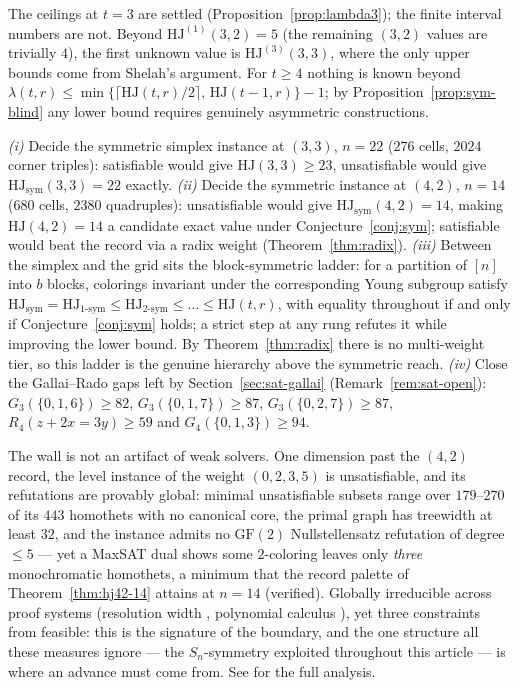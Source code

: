 \documentclass[12pt]{article}
\newcommand{\HJ}{\mathrm{HJ}}
\begin{document}
\begin{question}\label{q:interval}
The ceilings at $t=3$ are settled (Proposition~\ref{prop:lambda3}); the
finite interval numbers are not. Beyond $\HJ^{(1)}(3,2)=5$ (the
remaining $(3,2)$ values are trivially $4$), the first unknown value is
$\HJ^{(3)}(3,3)$, where the only upper bounds come from Shelah's
argument. For $t\ge 4$ nothing is known beyond
$\lambda(t,r)\le\min\{\lceil\HJ(t,r)/2\rceil,\,\HJ(t-1,r)\}-1$; by
Proposition~\ref{prop:sym-blind} any lower bound requires genuinely
asymmetric constructions.
\end{question}

\begin{question}[Frontiers]\label{q:frontiers}
\emph{(i)} Decide the symmetric simplex instance at $(3,3)$, $n=22$
($276$ cells, $2024$ corner triples): satisfiable would give
$\HJ(3,3)\ge 23$, unsatisfiable would give
$\HJ_{\mathrm{sym}}(3,3)=22$ exactly.
\emph{(ii)} Decide the symmetric instance at $(4,2)$, $n=14$ ($680$
cells, $2380$ quadruples): unsatisfiable would give
$\HJ_{\mathrm{sym}}(4,2)=14$, making $\HJ(4,2)=14$ a candidate exact
value under Conjecture~\ref{conj:sym}; satisfiable would beat the
record via a radix weight (Theorem~\ref{thm:radix}).
\emph{(iii)} Between the simplex and the grid sits the block-symmetric
ladder: for a partition of $[n]$ into $b$ blocks, colorings invariant
under the corresponding Young subgroup satisfy
$\HJ_{\mathrm{sym}}=\HJ_{1\text{-}\mathrm{sym}}
\le\HJ_{2\text{-}\mathrm{sym}}\le\dots\le\HJ(t,r)$, with equality
throughout if and only if Conjecture~\ref{conj:sym} holds; a strict
step at any rung refutes it while improving the lower bound. By
Theorem~\ref{thm:radix} there is no multi-weight tier, so this ladder
is the genuine hierarchy above the symmetric reach.
\emph{(iv)} Close the Gallai--Rado gaps left by
Section~\ref{sec:sat-gallai} (Remark~\ref{rem:sat-open}):
$G_{3}(\{0,1,6\})\ge 82$, $G_{3}(\{0,1,7\})\ge 87$,
$G_{3}(\{0,2,7\})\ge 87$, $R_{4}(z+2x=3y)\ge 59$ and
$G_{4}(\{0,1,3\})\ge 94$.
\end{question}

\begin{remark}\label{rem:hardness}
The wall is not an artifact of weak solvers. One dimension past the
$(4,2)$ record, the level instance of the weight $(0,2,3,5)$ is
unsatisfiable, and its refutations are provably global: minimal
unsatisfiable subsets range over $179$--$270$ of its $443$ homothets
with no canonical core, the primal graph has treewidth at least $32$,
and the instance admits no $\mathrm{GF}(2)$ Nullstellensatz refutation
of degree $\le 5$ --- yet a MaxSAT dual shows some $2$-coloring leaves
only \emph{three} monochromatic homothets, a minimum that the record
palette of Theorem~\ref{thm:hj42-14} attains at $n=14$ (verified).
Globally irreducible across proof systems (resolution width
\cite{atserias2008width}, polynomial calculus
\cite{ips1999pc,alon1999nullstellensatz}), yet three constraints from
feasible: this is the signature of the boundary, and the one structure
all these measures ignore --- the $S_{n}$-symmetry exploited throughout
this article --- is where an advance must come from. See \cite{thesis}
for the full analysis.
\end{remark}
\end{document}
